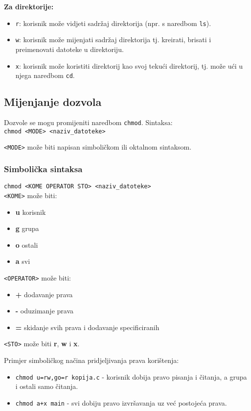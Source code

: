 \textbf{Za direktorije:}
\begin{itemize}
\item \texttt{r}: korisnik može vidjeti sadržaj direktorija (npr. s naredbom \texttt{ls}).
\item \texttt{w}: korisnik može mijenjati sadržaj direktorija tj. kreirati, brisati i preimenovati datoteke u direktoriju.
\item \texttt{x}: korisnik može koristiti direktorij kao svoj tekući direktorij, tj. može ući u njega naredbom \texttt{cd}. 
\end{itemize}

\subsection*{Mijenjanje dozvola}
Dozvole se mogu promijeniti naredbom \texttt{chmod}. Sintaksa:\\ \texttt{chmod <MODE> <naziv\_datoteke>}

\texttt{<MODE>} može biti napisan simboličkom ili oktalnom sintaksom.
\subsubsection*{Simbolička sintaksa}
\texttt{chmod <KOME OPERATOR STO> <naziv\_datoteke>}\\

\texttt{<KOME>} može biti:
\begin{itemize}
\item \textbf{u} korisnik
\item \textbf{g} grupa
\item \textbf{o} ostali
\item \textbf{a} svi
\end{itemize}

\texttt{<OPERATOR>} može biti:
\begin{itemize}
\item \textbf{+} dodavanje prava
\item \textbf{-} oduzimanje prava
\item \textbf{=} skidanje svih prava i dodavanje specificiranih
\end{itemize}

\texttt{<STO>} može biti \textbf{r}, \textbf{w} i \textbf{x}.
\begin{primjer}{Primjer simboličkog načina pridjeljivanja prava korištenja:}
\begin{itemize}
\item \texttt{chmod u=rw,go=r kopija.c} - korisnik dobija pravo pisanja i čitanja, a grupa i ostali samo čitanja.
\item \texttt{chmod a+x main} - svi dobiju pravo izvršavanja uz već postojeća prava.
\end{itemize}
\end{primjer}
